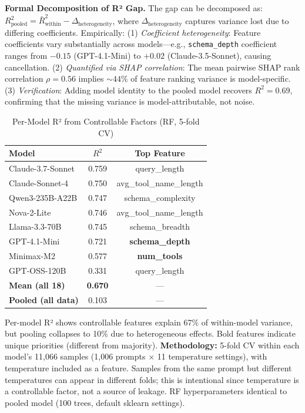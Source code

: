 \documentclass[sigconf,anonymous,review]{acmart}
\begin{document}
\textbf{Formal Decomposition of R² Gap.} The gap can be decomposed as: $R^2_{\text{pooled}} = \bar{R}^2_{\text{within}} - \Delta_{\text{heterogeneity}}$, where $\Delta_{\text{heterogeneity}}$ captures variance lost due to differing coefficients. Empirically: (1) \textit{Coefficient heterogeneity}: Feature coefficients vary substantially across models---e.g., \texttt{schema\_depth} coefficient ranges from $-0.15$ (GPT-4.1-Mini) to $+0.02$ (Claude-3.5-Sonnet), causing cancellation. (2) \textit{Quantified via SHAP correlation}: The mean pairwise SHAP rank correlation $\rho = 0.56$ implies $\sim44\%$ of feature ranking variance is model-specific. (3) \textit{Verification}: Adding model identity to the pooled model recovers $R^2 = 0.69$, confirming that the missing variance is model-attributable, not noise.

\begin{table}[t]
\centering
\caption{Per-Model R² from Controllable Factors (RF, 5-fold CV)}
\label{tab:permodel_r2}
\small
\begin{tabular}{@{}lcc@{}}
\toprule
\textbf{Model} & \textbf{$R^2$} & \textbf{Top Feature} \\
\midrule
Claude-3.7-Sonnet & 0.759 & query\_length \\
Claude-Sonnet-4 & 0.750 & avg\_tool\_name\_length \\
Qwen3-235B-A22B & 0.747 & schema\_complexity \\
Nova-2-Lite & 0.746 & avg\_tool\_name\_length \\
Llama-3.3-70B & 0.745 & schema\_breadth \\
GPT-4.1-Mini & 0.721 & \textbf{schema\_depth} \\
Minimax-M2 & 0.577 & \textbf{num\_tools} \\
GPT-OSS-120B & 0.331 & query\_length \\
\midrule
\textbf{Mean (all 18)} & \textbf{0.670} & --- \\
\textbf{Pooled (all data)} & 0.103 & --- \\
\bottomrule
\end{tabular}
\vspace{0.3em}

\raggedright\footnotesize Per-model R² shows controllable features explain 67\% of within-model variance, but pooling collapses to 10\% due to heterogeneous effects. Bold features indicate unique priorities (different from majority). \textbf{Methodology:} 5-fold CV within each model's 11,066 samples (1,006 prompts $\times$ 11 temperature settings), with temperature included as a feature. Samples from the same prompt but different temperatures can appear in different folds; this is intentional since temperature is a controllable factor, not a source of leakage. RF hyperparameters identical to pooled model (100 trees, default sklearn settings).
\end{table}
\end{document}
